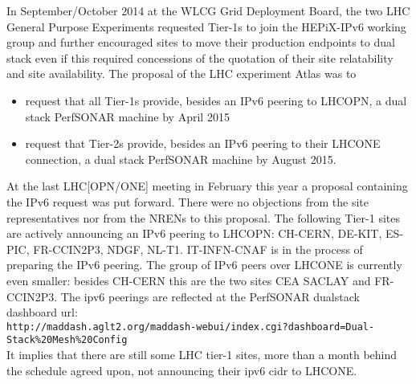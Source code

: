 In September/October 2014 at the WLCG Grid Deployment Board, the two LHC General Purpose Experiments  requested Tier-1s to join the HEPiX-IPv6 working group and further encouraged sites to move their production endpoints to dual stack even if this required concessions of the quotation of their site relatability and site availability. The proposal of the LHC experiment Atlas was to
\begin{itemize}
 \item request that all Tier-1s provide,
	besides an IPv6 peering to LHCOPN,
        a dual stack PerfSONAR machine by April 2015
 \item request that Tier-2s provide,
        besides an IPv6 peering to their LHCONE connection,
        a dual stack PerfSONAR machine by August 2015.
\end{itemize}
At the last LHC[OPN/ONE] meeting in February this year a proposal containing the IPv6 request was put forward. There were no objections from the site representatives nor from the NRENs to this proposal. The following Tier-1 sites are actively announcing an IPv6 peering to LHCOPN: CH-CERN, DE-KIT, ES-PIC, FR-CCIN2P3, NDGF, NL-T1. IT-INFN-CNAF is in the process of preparing the IPv6 peering. The group of IPv6 peers over LHCONE is currently even smaller: besides CH-CERN this are the two sites CEA SACLAY and FR-CCIN2P3.
The ipv6 peerings are reflected at the PerfSONAR dualstack dashboard url:\\{\tt\small http://maddash.aglt2.org/maddash-webui/index.cgi?dashboard=Dual-Stack\%20Mesh\%20Config} \\ It implies that there are still some LHC tier-1 sites, more than a month behind the schedule agreed upon, not announcing their ipv6 cidr to LHCONE.

